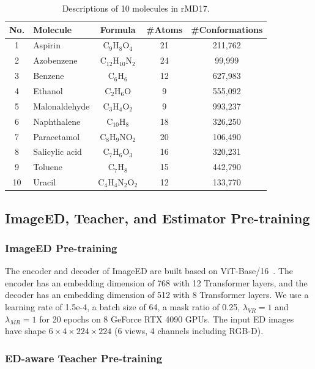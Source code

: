 \begin{table}[!htb]
  \centering
  \caption{Descriptions of 10 molecules in rMD17.}
  \label{tab:rmd17_molecules}
  \scriptsize
    \begin{tabular}{clccc}
    \toprule
    \textbf{No.} & \textbf{Molecule} & \textbf{Formula} & \textbf{\#Atoms} & \textbf{\#Conformations} \\
    \midrule
    1 & Aspirin & C$_9$H$_8$O$_4$ & 21 & 211,762 \\
    2 & Azobenzene & C$_{12}$H$_{10}$N$_2$ & 24 & 99,999 \\
    3 & Benzene & C$_6$H$_6$ & 12 & 627,983 \\
    4 & Ethanol & C$_2$H$_6$O & 9 & 555,092 \\
    5 & Malonaldehyde & C$_3$H$_4$O$_2$ & 9 & 993,237 \\
    6 & Naphthalene & C$_{10}$H$_8$ & 18 & 326,250 \\
    7 & Paracetamol & C$_8$H$_9$NO$_2$ & 20 & 106,490 \\
    8 & Salicylic acid & C$_7$H$_6$O$_3$ & 16 & 320,231 \\
    9 & Toluene & C$_7$H$_8$ & 15 & 442,790 \\
    10 & Uracil & C$_4$H$_4$N$_2$O$_2$ & 12 & 133,770 \\
    \bottomrule
    \end{tabular}
\end{table}


\subsection{ImageED, Teacher, and Estimator Pre-training}
\label{sec:appendix_implementation}

\subsubsection{ImageED Pre-training}

The encoder and decoder of ImageED are built based on ViT-Base/16~\cite{dosovitskiy2020image}. The encoder has an embedding dimension of 768 with 12 Transformer layers, and the decoder has an embedding dimension of 512 with 8 Transformer layers. We use a learning rate of 1.5e-4, a batch size of 64, a mask ratio of 0.25, $\lambda_{VR}=1$ and $\lambda_{MR}=1$ for 20 epochs on 8 GeForce RTX 4090 GPUs. The input ED images have shape $6 \times 4 \times 224 \times 224$ (6 views, 4 channels including RGB-D).

\subsubsection{ED-aware Teacher Pre-training}

